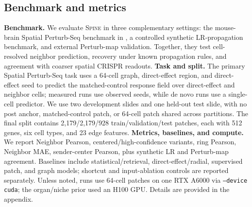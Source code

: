 \documentclass[sigconf,review,balance=false]{acmart}
\newcommand{\methodname}{\textsc{Spine}\xspace}
\begin{document}
\subsection{Benchmark and metrics}
\label{sec:benchmark_metrics}
\textbf{Benchmark.}
We evaluate \methodname{} in three complementary settings: the mouse-brain Spatial Perturb-Seq benchmark in , a controlled synthetic LR-propagation benchmark, and external Perturb-map validation. Together, they test cell-resolved neighbor prediction, recovery under known propagation rules, and agreement with coarser spatial CRISPR readouts. \textbf{Task and split.}
The primary Spatial Perturb-Seq task uses a 64-cell graph, direct-effect region, and direct-effect seed to predict the matched-control response field over direct-effect and neighbor cells; measured runs use observed seeds, while de novo runs use a single-cell predictor. We use two development slides and one held-out test slide, with no post anchor, matched-control patch, or 64-cell patch shared across partitions. The final split contains 2{,}179/2{,}179/928 train/validation/test patches, each with 512 genes, six cell types, and 23 edge features. \textbf{Metrics, baselines, and compute.}
We report Neighbor Pearson, centered/high-confidence variants, ring Pearson, Neighbor MAE, sender-center Pearson, plus synthetic LR and Perturb-map agreement. Baselines include statistical/retrieval, direct-effect/radial, supervised patch, and graph models; shortcut and input-ablation controls are reported separately. Unless noted, runs use 64-cell patches on one RTX A6000 via \texttt{--device cuda}; the organ/niche prior used an H100 GPU. Details are provided in the appendix.
\end{document}

